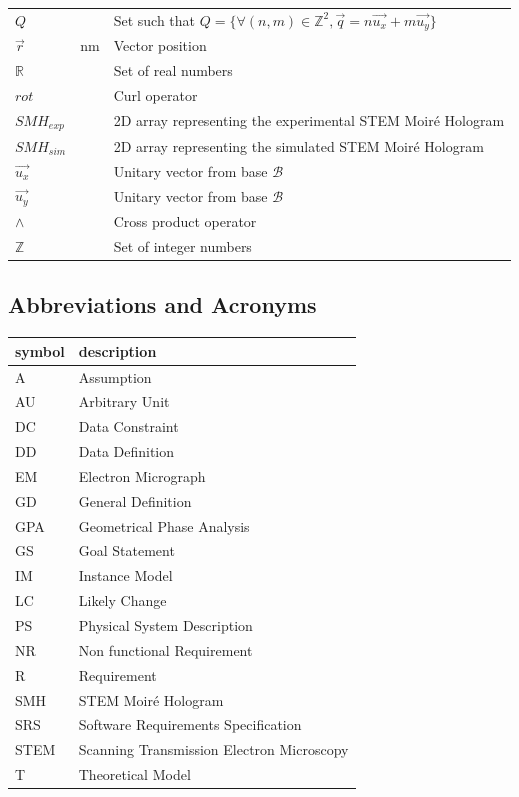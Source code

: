 \documentclass[12pt]{article}
\begin{document}
\begin{longtable*}{l l p{12cm}}
$Q$ & & Set such that $Q=\{\forall (n,m) \in \mathbb{Z}^{2}, \vec{q}=n\vec{u_x}+m\vec{u_y}\}$ \\
$\vec{r}$ & \si{\nano\meter} & Vector position \\
$\mathbb{R}$ & & Set of real numbers \\
$rot$ & & Curl operator\\
$SMH_{exp}$ & & 2D array representing the experimental STEM Moir{\'e} Hologram \\
$SMH_{sim}$ & & 2D array representing the simulated STEM Moir{\'e} Hologram \\
$\vec{u_x}$ & & Unitary vector from base $\mathcal{B}$ \\
$\vec{u_y}$ & & Unitary vector from base $\mathcal{B}$ \\
$\wedge$ & & Cross product operator\\
$\mathbb{Z}$ & & Set of integer numbers\\
\bottomrule
\end{longtable*}

\subsection{Abbreviations and Acronyms}

\renewcommand{\arraystretch}{1.2}
\begin{tabular}{l l} 
  \toprule		
  \textbf{symbol} & \textbf{description}\\
  \midrule 
  A & Assumption\\
  AU & Arbitrary Unit\\
  DC & Data Constraint \\
  DD & Data Definition\\
  EM & Electron Micrograph \\
  GD & General Definition\\
  GPA & Geometrical Phase Analysis \\
  GS & Goal Statement\\
  IM & Instance Model\\
  LC & Likely Change\\
  PS & Physical System Description\\
  NR & Non functional Requirement\\
  R & Requirement\\
  SMH & STEM Moir{\'e} Hologram \\
  SRS & Software Requirements Specification\\
  STEM & Scanning Transmission Electron Microscopy \\
  T & Theoretical Model\\
  \bottomrule
\end{tabular}\\
\end{document}
